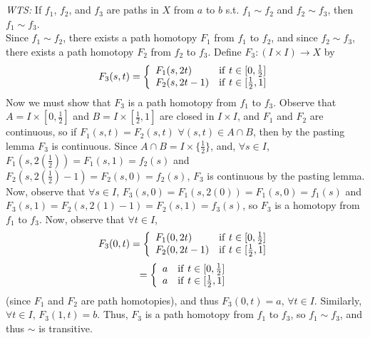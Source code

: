 \documentclass[12pt]{article}
\begin{document}
\\ \\\textit{WTS:} If $f_1$, $f_2$, and $f_3$ are paths in $X$ from $a$ to $b$ s.t. $f_1 \sim f_2$ and $f_2 \sim f_3$, then $f_1 \sim f_3$.
\\Since $f_1 \sim f_2$, there exists a path homotopy $F_1$ from $f_1$ to $f_2$, and since $f_2 \sim f_3$, there exists a path homotopy $F_2$ from $f_2$ to $f_3$. Define $F_3: (I \times I) \rightarrow X$ by \begin{displaymath}
   F_3(s,t) = \left\{
     \begin{array}{lr}
       F_1(s,2t) & \mathrm{if }$ $ t \in [0, \frac{1}{2}]\\
       F_2(s,2t - 1) & \mathrm{if }$ $ t \in [\frac{1}{2}, 1]
     \end{array}
   \right.
\end{displaymath}
Now we must show that $F_3$ is a path homotopy from $f_1$ to $f_3$. Observe that $A = I \times [0, \frac{1}{2}]$ and $B= I \times [\frac{1}{2}, 1]$ are closed in $I \times I$, and $F_1$ and $F_2$ are continuous, so if $F_1(s,t) = F_2(s,t)$ $\forall (s,t) \in A \cap B$, then by the pasting lemma $F_3$ is continuous. Since $A \cap B = I \times \{\frac{1}{2}\}$, and, $\forall s \in I$, $F_1(s, 2(\frac{1}{2})) = F_1(s, 1) = f_2(s)$ and $F_2(s, 2(\frac{1}{2}) - 1) = F_2(s, 0) = f_2(s)$, $F_3$ is continuous by the pasting lemma. Now, observe that $\forall s \in I$, $F_3(s, 0) = F_1(s, 2(0)) = F_1(s, 0) = f_1(s)$ and $F_3(s, 1) = F_2(s, 2(1) - 1) = F_2(s, 1) = f_3(s)$, so $F_3$ is a homotopy from $f_1$ to $f_3$. Now, observe that $\forall t \in I$, 
\begin{displaymath}
   F_3(0,t) = \left\{
     \begin{array}{lr}
       F_1(0,2t) & \mathrm{if }$ $ t \in [0, \frac{1}{2}]\\
       F_2(0,2t - 1) & \mathrm{if }$ $ t \in [\frac{1}{2}, 1]
     \end{array}
   \right.
\end{displaymath}
\begin{displaymath} 
    = \left\{
     \begin{array}{lr}
       a & \mathrm{if}$ $ t \in [0, \frac{1}{2}]\\
       a & \mathrm{if}$ $ t \in [\frac{1}{2}, 1]
     \end{array}
   \right.
\end{displaymath} 
(since $F_1$ and $F_2$ are path homotopies), and thus $F_3(0,t) = a$, $\forall t \in I$. Similarly, $\forall t \in I$, $F_3(1,t) = b$. Thus, $F_3$ is a path homotopy from $f_1$ to $f_3$, so $f_1 \sim f_3$, and thus $\sim$ is transitive.
\end{document}
